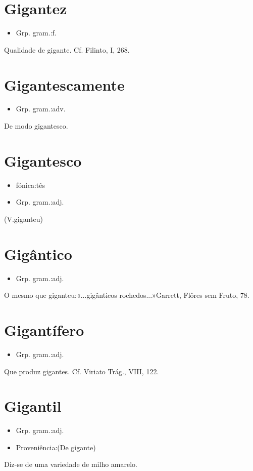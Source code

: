\section{Gigantez}
\begin{itemize}
\item {Grp. gram.:f.}
\end{itemize}
Qualidade de gigante. Cf. Filinto, I, 268.
\section{Gigantescamente}
\begin{itemize}
\item {Grp. gram.:adv.}
\end{itemize}
De modo gigantesco.
\section{Gigantesco}
\begin{itemize}
\item {fónica:tês}
\end{itemize}
\begin{itemize}
\item {Grp. gram.:adj.}
\end{itemize}
(V.giganteu)
\section{Gigântico}
\begin{itemize}
\item {Grp. gram.:adj.}
\end{itemize}
O mesmo que \textunderscore giganteu\textunderscore :«\textunderscore ...gigânticos rochedos...\textunderscore »Garrett, \textunderscore Flôres sem Fruto\textunderscore , 78.
\section{Gigantífero}
\begin{itemize}
\item {Grp. gram.:adj.}
\end{itemize}
Que produz gigantes. Cf. \textunderscore Viriato Trág.\textunderscore , VIII, 122.
\section{Gigantil}
\begin{itemize}
\item {Grp. gram.:adj.}
\end{itemize}
\begin{itemize}
\item {Proveniência:(De \textunderscore gigante\textunderscore )}
\end{itemize}
Diz-se de uma variedade de milho amarelo.
